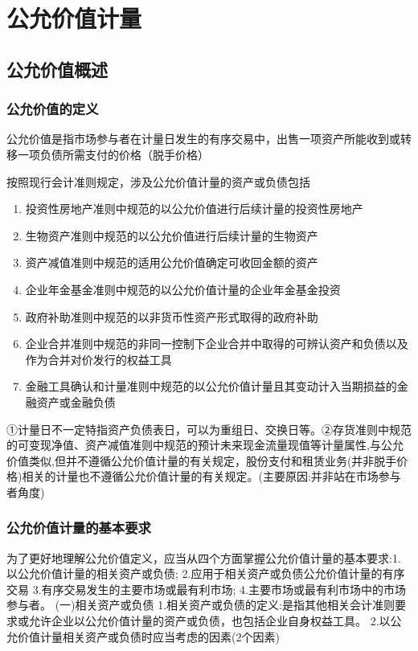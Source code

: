 \documentclass[UTF8,12pt]{ctexart}
\numberwithin{equation}{section} %
\numberwithin{figure}{section}
\numberwithin{table}{section}
\begin{document}
	\newpage
	
	\section{公允价值计量}
	\subsection{公允价值概述}
	
	\subsubsection{公允价值的定义}
	公允价值是指市场参与者在计量日发生的有序交易中，出售一项资产所能收到或转移一项负债所需支付的价格（脱手价格）
	
	按照现行会计准则规定，涉及公允价值计量的资产或负债包括
	\begin{enumerate}
		\item 投资性房地产准则中规范的以公允价值进行后续计量的投资性房地产
		
		\item 生物资产准则中规范的以公允价值进行后续计量的生物资产
		
		\item 资产减值准则中规范的适用公允价值确定可收回金额的资产
		
		\item 企业年金基金准则中规范的以公允价值计量的企业年金基金投资
		
		\item 政府补助准则中规范的以非货币性资产形式取得的政府补助
		
		\item 企业合并准则中规范的非同一控制下企业合并中取得的可辨认资产和负债以及作为合并对价发行的权益工具
		
		\item 金融工具确认和计量准则中规范的以公允价值计量且其变动计入当期损益的金融资产或金融负债
	\end{enumerate}
	①计量日不一定特指资产负债表日，可以为重组日、交换日等。②存货准则中规范的可变现净值、资产减值准则中规范的预计未来现金流量现值等计量属性,与公允价值类似,但并不遵循公允价值计量的有关规定，股份支付和租赁业务(并非脱手价格)相关的计量也不遵循公允价值计量的有关规定。(主要原因:并非站在市场参与者角度)
	\subsubsection{公允价值计量的基本要求}
	为了更好地理解公允价值定义，应当从四个方面掌握公允价值计量的基本要求:1.以公允价值计量的相关资产或负债;
	2.应用于相关资产或负债公允价值计量的有序交易
	3.有序交易发生的主要市场或最有利市场;
	4.主要市场或最有利市场中的市场参与者。
	(一)相关资产或负债
	1.相关资产或负债的定义:是指其他相关会计准则要求或允许企业以公允价值计量的资产或负债，也包括企业自身权益工具。
	2.以公允价值计量相关资产或负债时应当考虑的因素(2个因素)
	
\end{document}
